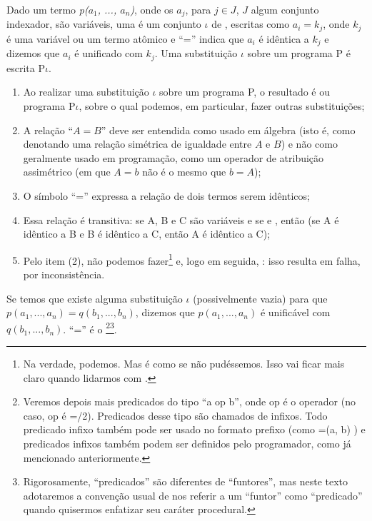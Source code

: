 
\begin{definition} Dado um termo {\it p($a_1$, ..., $a_n$)}, onde os $a_j$, para $j \in J$, $J$ algum conjunto indexador, são variáveis, uma  é um conjunto $\iota$ de , escritas como $a_i = k_j$, onde $k_j$ é uma variável ou um termo atômico e ``='' indica que $a_i$ é idêntica a $k_j$ e dizemos que $a_i$ é unificado com $k_j$.
  Uma substituição $\iota$ sobre um programa P é escrita P$\iota$.
\end{definition}

\begin{remark}
  \hfill
  \begin{enumerate}
    \item Ao realizar uma substituição $\iota$ sobre um programa P, o resultado é ou programa P$\iota$, sobre o qual podemos, em particular, fazer outras substituições;
    \item A relação ``$A = B$'' deve ser entendida como usado em álgebra (isto é, como denotando uma relação simétrica de igualdade entre $A$ e $B$) e não como geralmente usado em programação, como um operador de atribuição assimétrico (em que $A = b$ não é o mesmo que $b = A$);
    \item O símbolo ``='' expressa a relação de dois termos serem idênticos;
    \item Essa relação é transitiva: se A, B e C são variáveis e se  e , então  (se A é idêntico a B e B é idêntico a C, então A é idêntico a C);
    \item Pelo item (2), não podemos fazer\footnote{Na verdade, podemos. Mas é como se não pudéssemos. Isso vai ficar mais claro quando lidarmos com .}  e, logo em seguida, : isso resulta em falha, por inconsistência.
  \end{enumerate}
\end{remark}

Se temos que existe alguma substituição $\iota$ (possivelmente vazia) para que $p(a_1, ..., a_n) = q(b_1, ..., b_n)$, dizemos que  $p(a_1, ..., a_n)$ é unificável com $q(b_1, ..., b_n)$. ``='' é o \footnote{Veremos depois mais
  predicados do tipo ``a op b'', onde op é o operador (no caso, op é =/2). Predicados desse tipo são
  chamados de infixos. Todo predicado infixo também pode ser usado no formato prefixo (como =(a, b)
  ) e predicados infixos também podem ser definidos pelo programador, como já mencionado
  anteriormente.}\footnote{ Rigorosamente, ``predicados'' são diferentes de ``funtores'', mas neste
  texto adotaremos a convenção usual de nos referir a um ``funtor'' como ``predicado'' quando
  quisermos enfatizar seu caráter procedural. }.

